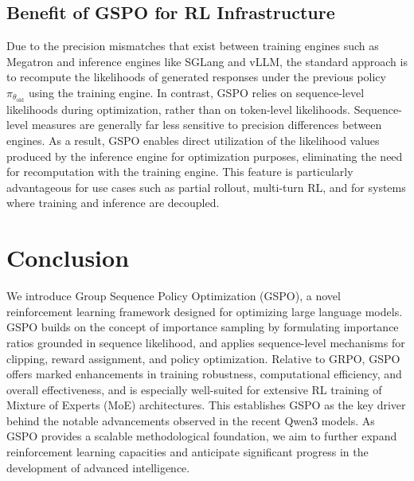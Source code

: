 \subsection{Benefit of GSPO for RL Infrastructure}

Due to the precision mismatches that exist between training engines such as Megatron and inference engines like SGLang and vLLM, the standard approach is to recompute the likelihoods of generated responses under the previous policy $\pi_{\theta_\text{old}}$ using the training engine. In contrast, GSPO relies on sequence-level likelihoods during optimization, rather than on token-level likelihoods. Sequence-level measures are generally far less sensitive to precision differences between engines. As a result, GSPO enables direct utilization of the likelihood values produced by the inference engine for optimization purposes, eliminating the need for recomputation with the training engine. This feature is particularly advantageous for use cases such as partial rollout, multi-turn RL, and for systems where training and inference are decoupled.

\section{Conclusion}

We introduce Group Sequence Policy Optimization (GSPO), a novel reinforcement learning framework designed for optimizing large language models. GSPO builds on the concept of importance sampling by formulating importance ratios grounded in sequence likelihood, and applies sequence-level mechanisms for clipping, reward assignment, and policy optimization. Relative to GRPO, GSPO offers marked enhancements in training robustness, computational efficiency, and overall effectiveness, and is especially well-suited for extensive RL training of Mixture of Experts (MoE) architectures. This establishes GSPO as the key driver behind the notable advancements observed in the recent Qwen3 models. As GSPO provides a scalable methodological foundation, we aim to further expand reinforcement learning capacities and anticipate significant progress in the development of advanced intelligence.

